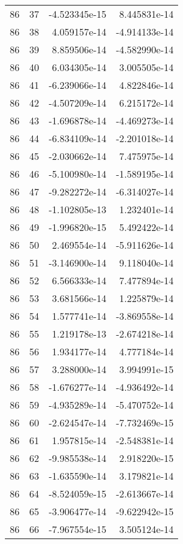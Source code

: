 \begin{tabular}{rrrr}
  86 &   37 & -4.523345e-15 &  8.445831e-14 \\
  86 &   38 &  4.059157e-14 & -4.914133e-14 \\
  86 &   39 &  8.859506e-14 & -4.582990e-14 \\
  86 &   40 &  6.034305e-14 &  3.005505e-14 \\
  86 &   41 & -6.239066e-14 &  4.822846e-14 \\
  86 &   42 & -4.507209e-14 &  6.215172e-14 \\
  86 &   43 & -1.696878e-14 & -4.469273e-14 \\
  86 &   44 & -6.834109e-14 & -2.201018e-14 \\
  86 &   45 & -2.030662e-14 &  7.475975e-14 \\
  86 &   46 & -5.100980e-14 & -1.589195e-14 \\
  86 &   47 & -9.282272e-14 & -6.314027e-14 \\
  86 &   48 & -1.102805e-13 &  1.232401e-14 \\
  86 &   49 & -1.996820e-15 &  5.492422e-14 \\
  86 &   50 &  2.469554e-14 & -5.911626e-14 \\
  86 &   51 & -3.146900e-14 &  9.118040e-14 \\
  86 &   52 &  6.566333e-14 &  7.477894e-14 \\
  86 &   53 &  3.681566e-14 &  1.225879e-14 \\
  86 &   54 &  1.577741e-14 & -3.869558e-14 \\
  86 &   55 &  1.219178e-13 & -2.674218e-14 \\
  86 &   56 &  1.934177e-14 &  4.777184e-14 \\
  86 &   57 &  3.288000e-14 &  3.994991e-15 \\
  86 &   58 & -1.676277e-14 & -4.936492e-14 \\
  86 &   59 & -4.935289e-14 & -5.470752e-14 \\
  86 &   60 & -2.624547e-14 & -7.732469e-15 \\
  86 &   61 &  1.957815e-14 & -2.548381e-14 \\
  86 &   62 & -9.985538e-14 &  2.918220e-15 \\
  86 &   63 & -1.635590e-14 &  3.179821e-14 \\
  86 &   64 & -8.524059e-15 & -2.613667e-14 \\
  86 &   65 & -3.906477e-14 & -9.622942e-15 \\
  86 &   66 & -7.967554e-15 &  3.505124e-14 \\

\end{tabular}
